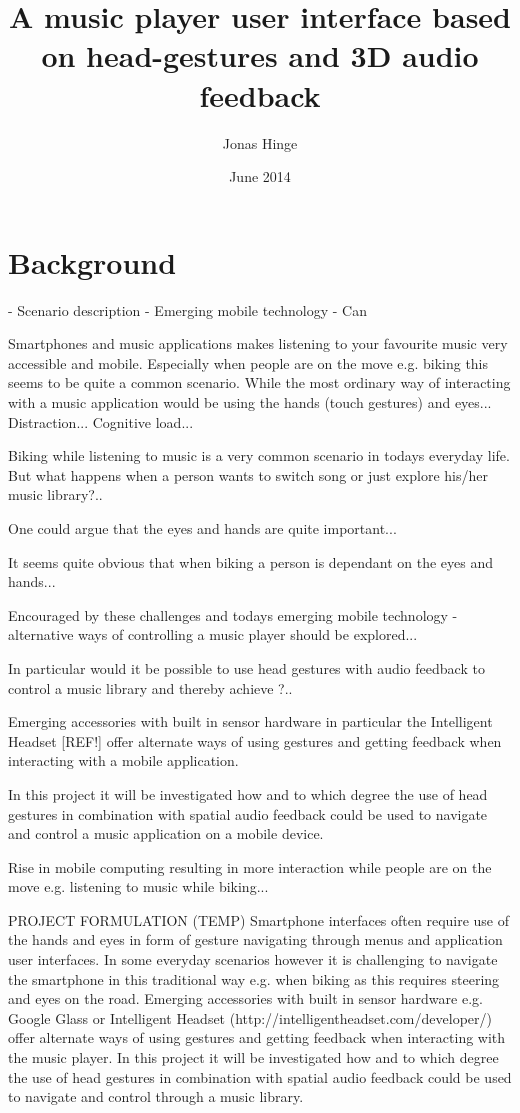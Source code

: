 \documentclass{article}
\title{A music player user interface based on head-gestures and 3D audio feedback}
\author{Jonas Hinge}
\date{June 2014}
\begin{document}
\maketitle

\section{Background}
- Scenario description
- Emerging mobile technology
- Can 

Smartphones and music applications makes listening to your favourite music very accessible and mobile. Especially when people are on the move e.g. biking this seems to be quite a common scenario. While the most ordinary way of interacting with a music application would be using the hands (touch gestures) and eyes... Distraction... Cognitive load...

Biking while listening to music is a very common scenario in todays everyday life. But what happens when a person wants to switch song or just explore his/her music library?..

One could argue that the eyes and hands are quite important...

It seems quite obvious that when biking a person is dependant on the eyes and hands...

Encouraged by these challenges and todays emerging mobile technology - alternative ways of controlling a music player should be explored...

In particular would it be possible to use head gestures with audio feedback to control a music library and thereby achieve ?..

Emerging accessories with built in sensor hardware in particular the Intelligent Headset [REF!] offer alternate ways of using gestures and getting feedback when interacting with a mobile application. 

In this project it will be investigated how and to which degree the use of head gestures in combination with spatial audio feedback could be used to navigate and control a music application on a mobile device.




Rise in mobile computing resulting in more interaction while people are on the move e.g. listening to music while biking...

PROJECT FORMULATION (TEMP)
Smartphone interfaces often require use of the hands and eyes in form of gesture navigating through menus and application user interfaces. In some everyday scenarios however it is challenging to navigate the smartphone in this traditional way e.g. when biking as this requires steering and eyes on the road. Emerging accessories with built in sensor hardware e.g. Google Glass or Intelligent Headset (http://intelligentheadset.com/developer/) offer alternate ways of using gestures and getting feedback when interacting with the music player. In this project it will be investigated how and to which degree the use of head gestures in combination with spatial audio feedback could be used to navigate and control through a music library. 
\end{document}
